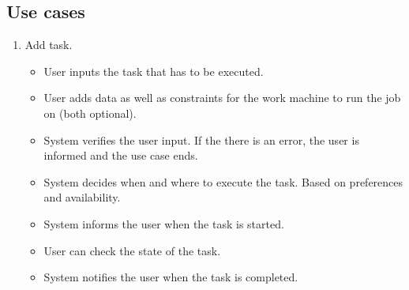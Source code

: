 \subsection{Use cases}
\begin{enumerate}
  \item Add task.
  \begin{itemize}
    \item User inputs the task that has to be executed.
    \item User adds data as well as constraints for the work machine to run the job on (both optional).
    \item System verifies the user input.
    If the there is an error, the user is informed and the use case ends.
    \item System decides when and where to execute the task.
    Based on preferences and availability.
    \item System informs the user when the task is started.
    \item User can check the state of the task.
    \item System notifies the user when the task is completed.
  \end{itemize}
\end{enumerate}
